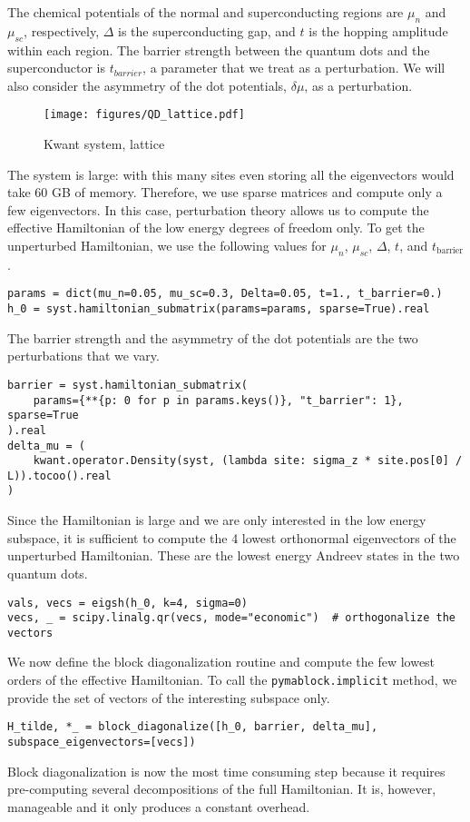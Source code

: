 The chemical potentials of the normal and superconducting regions are $\mu_n$
and $\mu_{sc}$, respectively, $\Delta$ is the superconducting gap, and $t$
is the hopping amplitude within each region.
The barrier strength between the quantum dots and the superconductor is
$t_{barrier}$, a parameter that we treat as a perturbation.
We will also consider the asymmetry of the dot potentials, $\delta \mu$, as a
perturbation.
%
\begin{figure}
\centering
\texttt{[image: figures/QD\_lattice.pdf]}
\caption{Kwant system, lattice}
\label{fig:QD_lattice}
\end{figure}
%
The system is large: with this many sites even storing all the eigenvectors
would take 60 GB of memory.
Therefore, we use sparse matrices and compute only a few eigenvectors.
In this case, perturbation theory allows us to compute the effective
Hamiltonian of the low energy degrees of freedom only.
%
To get the unperturbed Hamiltonian, we use the following values for $\mu_n$,
$\mu_{sc}$, $\Delta$, $t$, and $t_{\text{barrier}}$.
%
\begin{verbatim}
params = dict(mu_n=0.05, mu_sc=0.3, Delta=0.05, t=1., t_barrier=0.)
h_0 = syst.hamiltonian_submatrix(params=params, sparse=True).real
\end{verbatim}

The barrier strength and the asymmetry of the dot potentials are the two
perturbations that we vary.

\begin{verbatim}
barrier = syst.hamiltonian_submatrix(
    params={**{p: 0 for p in params.keys()}, "t_barrier": 1}, sparse=True
).real
delta_mu = (
    kwant.operator.Density(syst, (lambda site: sigma_z * site.pos[0] / L)).tocoo().real
)
\end{verbatim}

Since the Hamiltonian is large and we are only interested in the low energy
subspace, it is sufficient to compute the 4 lowest orthonormal eigenvectors of
the unperturbed Hamiltonian.
These are the lowest energy Andreev states in the two quantum dots.
%
\begin{verbatim}
vals, vecs = eigsh(h_0, k=4, sigma=0)
vecs, _ = scipy.linalg.qr(vecs, mode="economic")  # orthogonalize the vectors
\end{verbatim}
%
We now define the block diagonalization routine and compute the few lowest
orders of the effective Hamiltonian.
To call the \texttt{pymablock.implicit} method, we provide the set
of vectors of the interesting subspace only.
%
\begin{verbatim}
H_tilde, *_ = block_diagonalize([h_0, barrier, delta_mu], subspace_eigenvectors=[vecs])
\end{verbatim}
%
Block diagonalization is now the most time consuming step because it requires
pre-computing several decompositions of the full Hamiltonian.
It is, however, manageable and it only produces a constant overhead.


